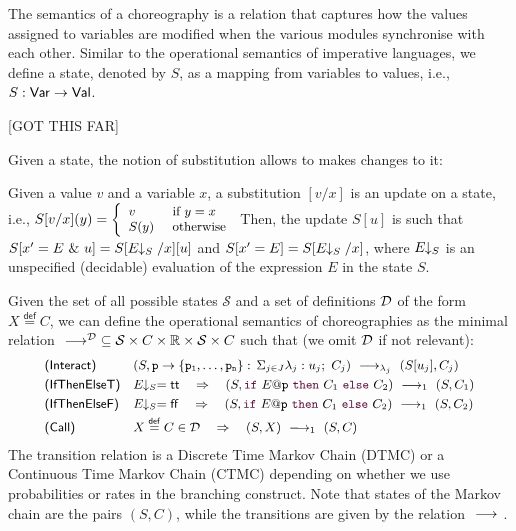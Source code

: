  The semantics of a choreography is a relation that
captures how the values assigned to variables are modified when the
various modules synchronise with each other. Similar to the
operational semantics of imperative languages, we define a state,
denoted by $S$, as a mapping from variables to values, i.e.,
$S: \mathsf{Var} \rightarrow\mathsf{Val}$.
%

[GOT THIS FAR]

Given a state, the notion of substitution allows to makes changes to
it: 
%
\begin{definition}
  Given a value $v$ and a variable $x$, a substitution $[v/x]$ is an
  update on a state, i.e., $\small S[v/x] (y)= \left\{
  \begin{array}{ll} 
    v    & \text{ if } y=x\\ 
    S(y) & \text{ otherwise}
  \end{array} \right.
$
%
Then, the update $S[u]$ is such that
$S[x'=E\ \&\ u] = S[E\!\!\downarrow_{S}/x][u]$ and $S[x'=E] = S[E\!\!\downarrow_{S}/x]$,
where $E\!\!\downarrow_{S}$ is an unspecified (decidable) evaluation of the
expression $E$ in the state $S$.
\end{definition}

Given the set of all possible states $\mathcal S$ and a set of
definitions $\mathcal D$ of the form $X\stackrel{\mathsf{def}}{=} C$, we
can define the operational semantics of choreographies as the minimal
relation
$\ \longrightarrow_{}\ \!\!\!\!^\mathcal D\subseteq \mathcal S\times C\times \mathbb
R\times \mathcal S\times C$ such that (we omit $\mathcal D$ if not
relevant):
\begin{displaymath}\small
  \begin{array}{l@{\quad}llll}
    \textsf{(Interact)} &
    (S, \interact{p}{\role p_1,\ldots,\role p_n}) 
    \red{\lambda_j}
    (S[u_j], C_j) 
    \\[1mm]
    \textsf{(IfThenElseT)} &
    \eval ES = \mathsf{tt} \quad\Rightarrow\quad
    (S,\ifTE {E}{p}{C_1}{C_2}) 
    \red{1}
    (S, C_1)
    \\[1mm]
    \textsf{(IfThenElseF)} &
    \eval ES = \mathsf{ff} \quad\Rightarrow\quad
    (S,\ifTE {E}{p}{C_1}{C_2}) 
    \red{1}
    (S, C_2)
    \\[1mm]
    \textsf{(Call)} &
    X\stackrel{\mathsf{def}}{=} C\in\defin \quad\Rightarrow\quad (S, X) \red{1}(S,C)
  \end{array}
\end{displaymath}
The transition relation is a Discrete Time Markov Chain (DTMC) or a
Continuous Time Markov Chain (CTMC) depending on whether we use
probabilities or rates in the branching construct. Note that states of
the Markov chain are the pairs $(S,C)$, while the transitions are
given by the relation $\ \longrightarrow_{}\ $.
%

